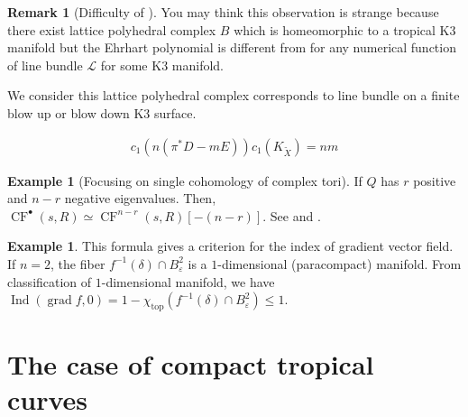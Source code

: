\documentclass[a4paper,dvipdfmx,reqno,12pt]{amsart}
\theoremstyle{definition}
\newtheorem{Eg}[Thm]{Example}
\newtheorem{Rmk}[Thm]{Remark}
\newcommand{\vep}{\varepsilon}%
\newcommand{\mcal}[1]{\mathcal{#1}}%
\newcommand{\opn}[1]{\operatorname{#1}}
\numberwithin{equation}{section}
\begin{document}
\begin{Rmk}[Difficulty of ]

  You may think this observation is strange because
  there exist lattice polyhedral
  complex $B$ which is homeomorphic to
  a tropical K3 manifold but the Ehrhart polynomial is different from
  for any numerical function of line bundle $\mcal{L}$ for some K3 manifold.

  We consider this lattice polyhedral complex corresponds to line bundle on
  a finite blow up or blow down K3 surface.

  \begin{align}
    c_1(n(\pi^{*}D-mE))c_1(K_{\tilde{X}})=nm
  \end{align}




\end{Rmk}




\begin{Eg}[Focusing on single cohomology of complex tori]
  If $Q$ has $r$ positive and $n-r$ negative eigenvalues. Then,
  $\opn{CF}^{\bullet}(s,R)\simeq \opn{CF}^{n-r}(s,R)[-(n-r)]$.
  See \cite[Theorem 3.5.5]{}
  and \cite[Corollary 48]{}.
\end{Eg}

\begin{Eg}
  This formula gives a criterion for the index of gradient vector field.
  If $n=2$, the fiber $f^{-1}(\delta)\cap B^{2}_{\vep}$ is a
  $1$-dimensional (paracompact) manifold. From classification
  of $1$-dimensional manifold, we have $\opn{Ind}(\opn{grad} f,0)=1-\chi_{\opn{top}} (f^{-1}(\delta)\cap B^{2}_{\vep})\leq 1$.
\end{Eg}

\section{The case of compact tropical curves}
\end{document}
